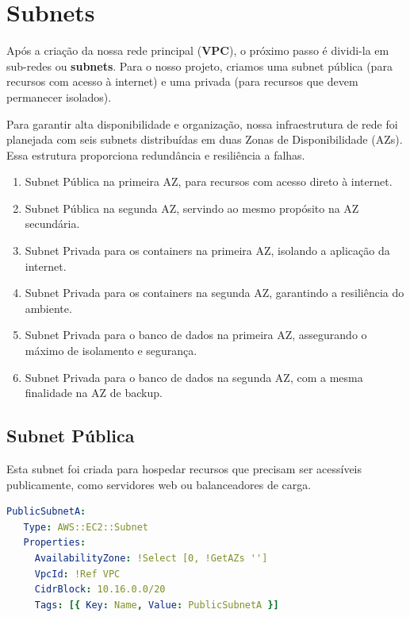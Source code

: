 \section{Subnets}
Após a criação da nossa rede principal (\textbf{VPC}), o próximo passo é dividi-la em sub-redes ou \textbf{subnets}. Para o nosso projeto, criamos uma subnet pública (para recursos com acesso à internet) e uma privada (para recursos que devem permanecer isolados).

Para garantir alta disponibilidade e organização, nossa infraestrutura de rede foi planejada com seis subnets distribuídas em duas Zonas de Disponibilidade (AZs). Essa estrutura proporciona redundância e resiliência a falhas.

\begin{enumerate}
    \item Subnet Pública na primeira AZ, para recursos com acesso direto à internet.
    \item Subnet Pública na segunda AZ, servindo ao mesmo propósito na AZ secundária.
    \item Subnet Privada para os containers na primeira AZ, isolando a aplicação da internet.
    \item Subnet Privada para os containers na segunda AZ, garantindo a resiliência do ambiente.
    \item Subnet Privada para o banco de dados na primeira AZ, assegurando o máximo de isolamento e segurança.
    \item Subnet Privada para o banco de dados na segunda AZ, com a mesma finalidade na AZ de backup.
\end{enumerate}

\subsection{Subnet Pública}
Esta subnet foi criada para hospedar recursos que precisam ser acessíveis publicamente, como servidores web ou balanceadores de carga.

\begin{lstlisting}[language=yaml, float=htbp]
 PublicSubnetA:
   Type: AWS::EC2::Subnet
   Properties:
     AvailabilityZone: !Select [0, !GetAZs '']
     VpcId: !Ref VPC
     CidrBlock: 10.16.0.0/20
     Tags: [{ Key: Name, Value: PublicSubnetA }]
\end{lstlisting}


